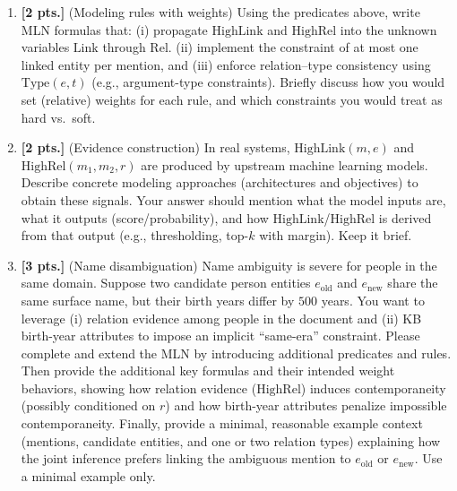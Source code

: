 \documentclass[11pt,a4paper]{article}
\begin{document}
\begin{enumerate}[label=(\alph*)]
    \item \textbf{[2 pts.]} (Modeling rules with weights) Using the predicates above, write MLN formulas that: (i) propagate $\mathrm{HighLink}$ and $\mathrm{HighRel}$ into the unknown variables $\mathrm{Link}$ through $\mathrm{Rel}$. (ii) implement the constraint of at most one linked entity per mention, and (iii) enforce relation--type consistency using $\mathrm{Type}(e, t)$ (e.g., argument-type constraints). Briefly discuss how you would set (relative) weights for each rule, and which constraints you would treat as hard vs.\ soft.
    \item \textbf{[2 pts.]} (Evidence construction) In real systems, $\mathrm{HighLink}(m, e)$ and $\mathrm{HighRel}(m_1, m_2, r)$ are produced by upstream machine learning models. Describe concrete modeling approaches (architectures and objectives) to obtain these signals. Your answer should mention what the model inputs are, what it outputs (score/probability), and how $\mathrm{HighLink}$/$\mathrm{HighRel}$ is derived from that output (e.g., thresholding, top-$k$ with margin). Keep it brief.
    \item \textbf{[3 pts.]} (Name disambiguation) Name ambiguity is severe for people in the same domain. Suppose two candidate person entities $e_{\mathrm{old}}$ and $e_{\mathrm{new}}$ share the same surface name, but their birth years differ by $500$ years. You want to leverage (i) relation evidence among people in the document and (ii) KB birth-year attributes to impose an implicit ``same-era'' constraint. Please complete and extend the MLN by introducing additional predicates and rules. Then provide the additional key formulas and their intended weight behaviors, showing how relation evidence ($\mathrm{HighRel}$) induces contemporaneity (possibly conditioned on $r$) and how birth-year attributes penalize impossible contemporaneity. Finally, provide a minimal, reasonable example context (mentions, candidate entities, and one or two relation types) explaining how the joint inference prefers linking the ambiguous mention to $e_{\mathrm{old}}$ or $e_{\mathrm{new}}$. Use a minimal example only.
\end{enumerate}
\end{document}
